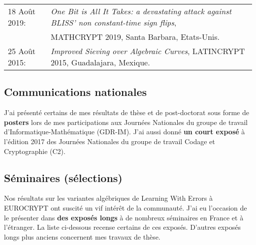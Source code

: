 \documentclass[11pt]{article}
\begin{document}
\hspace{-0.85cm}\begin{tabular}{ll}
 18 Août 2019: & {\em One Bit is All It Takes: a devastating attack against BLISS' non constant-time sign flips},\\ & MATHCRYPT 2019, Santa Barbara, Etats-Unis.\\[5pt]
 25 Août 2015: & {\em Improved Sieving over Algebraic Curves}, LATINCRYPT 2015, Guadalajara, Mexique.
\end{tabular}


\subsection*{Communications nationales}

J'ai présenté certains de mes résultats de thèse et de post-doctorat sous forme de \textbf{posters} lors de mes participations aux Journées Nationales du groupe de travail d'Informatique-Mathématique (GDR-IM).
J'ai aussi donné \textbf{un court exposé} à l'édition 2017 des Journées Nationales du groupe de travail Codage et Cryptographie (C2).


\subsection*{Séminaires (sélections)}

Nos résultats sur les variantes algébriques de Learning With Errors à EUROCRYPT ont suscité un vif intérêt de la communauté.
J'ai eu l'occasion de le présenter dans \textbf{des exposés longs} à de nombreux séminaires en France et à l'étranger.
La liste ci-dessous recense certains de ces exposés. D'autres exposés longs plus anciens concernent mes travaux de thèse.\\
\end{document}
